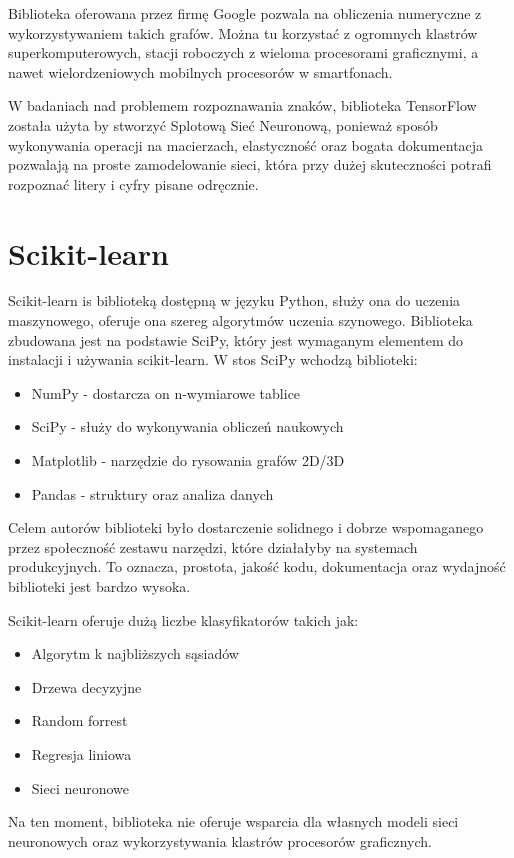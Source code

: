 \documentclass[brudnopis]{xmgr}
\begin{document}
Biblioteka oferowana przez firmę Google pozwala na obliczenia numeryczne z wykorzystywaniem takich grafów. Można tu korzystać z ogromnych klastrów superkomputerowych, stacji roboczych z wieloma procesorami graficznymi, a nawet wielordzeniowych mobilnych procesorów w smartfonach.

W badaniach nad problemem rozpoznawania znaków, biblioteka TensorFlow została użyta by stworzyć Splotową  Sieć Neuronową, ponieważ sposób wykonywania operacji na macierzach, elastyczność oraz bogata dokumentacja pozwalają na proste zamodelowanie sieci, która przy dużej skuteczności potrafi rozpoznać litery i cyfry pisane odręcznie.

\section{Scikit-learn}

Scikit-learn\cite{17} is biblioteką dostępną w języku Python, służy ona do uczenia maszynowego, oferuje ona szereg algorytmów uczenia szynowego. Biblioteka zbudowana jest na podstawie SciPy, który jest wymaganym elementem do instalacji i używania scikit-learn. W stos SciPy wchodzą biblioteki:

\begin{itemize}
\item
NumPy - dostarcza on n-wymiarowe tablice
\item
SciPy - służy do wykonywania obliczeń naukowych
\item
Matplotlib - narzędzie do rysowania grafów 2D/3D
\item
Pandas - struktury oraz analiza danych
\end{itemize}

Celem autorów biblioteki było dostarczenie solidnego i dobrze wspomaganego przez społeczność zestawu narzędzi, które działałyby na systemach produkcyjnych. To oznacza,  prostota, jakość kodu, dokumentacja oraz wydajność biblioteki jest bardzo wysoka.

Scikit-learn oferuje dużą liczbe klasyfikatorów takich jak:
\begin{itemize}
\item
Algorytm k najbliższych sąsiadów
\item
Drzewa decyzyjne
\item
Random forrest
\item
Regresja liniowa
\item
Sieci neuronowe
\end{itemize}

Na ten moment, biblioteka nie oferuje wsparcia dla własnych modeli sieci neuronowych oraz wykorzystywania klastrów procesorów graficznych.
\end{document}

